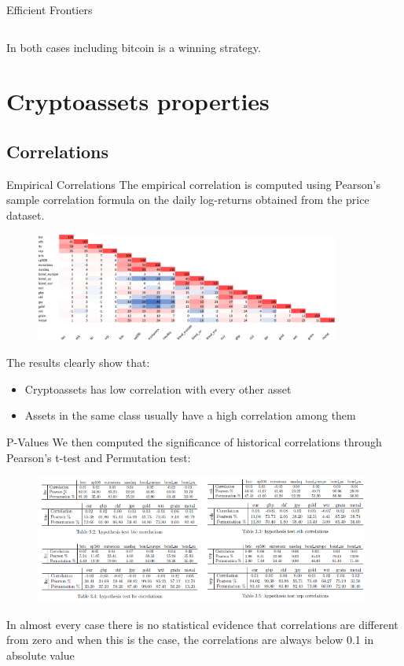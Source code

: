 \documentclass[c, 10pt]{beamer}
\begin{document}
\begin{frame}{Efficient Frontiers}
\begin{columns}
\begin{column}{0.5\textwidth}
		\end{column}
	\end{columns}
	In both cases including bitcoin is a winning strategy.
\end{frame}

\section{Cryptoassets properties}

\subsection{Correlations}
\begin{frame}{Empirical Correlations}
	The empirical correlation is computed using Pearson's sample correlation formula on the daily log-returns obtained from the price dataset.
	\begin{figure}
		\centering
		\includegraphics[width=10cm,trim=4 4 4 4,clip]{Images/empcorr}
	\end{figure}
	The results clearly show that:
	\begin{itemize}
		\item Cryptoassets has low correlation with every other asset
		\item Assets in the same class usually have a high correlation among them
	\end{itemize}
\end{frame}
\begin{frame}{P-Values}
	We then computed the significance of historical correlations through Pearson's t-test and Permutation test:
	\begin{figure}
		\centering
		\includegraphics[width=11cm]{Images/sigtable}
	\end{figure}
	In almost every case there is no statistical evidence that correlations are different from zero and when this is the case, the correlations are always below 0.1 in absolute value
\end{frame}
\end{document}
